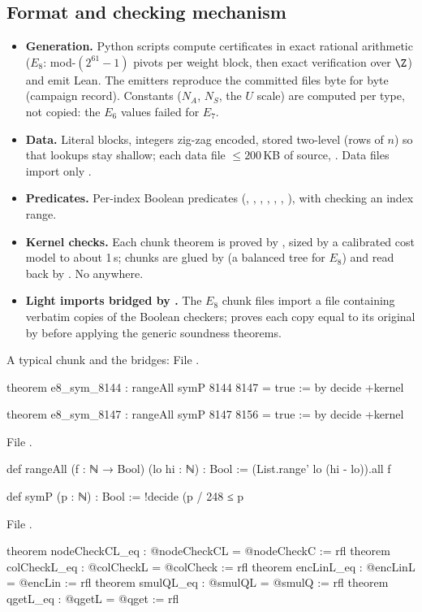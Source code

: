 \subsection{Format and checking mechanism}

\begin{itemize}
\item \textbf{Generation.} Python scripts compute certificates in
  exact rational arithmetic ($E_8$: mod-$(2^{61}-1)$ pivots per weight block, then exact verification over $\Z$) and
  emit Lean. The emitters reproduce the committed files byte for byte (campaign record). Constants
  ($N_A$, $N_S$, the $U$ scale) are computed per type, not copied: the $E_6$ values failed for $E_7$.
\item \textbf{Data.} Literal  blocks, integers zig-zag encoded, stored two-level (rows of $n$) so
  that  lookups stay shallow; each data file $\le200$\,KB of source, .
  Data files import only .
\item \textbf{Predicates.} Per-index Boolean predicates (, , , ,
  , , ), with  checking an index range.
\item \textbf{Kernel checks.} Each chunk theorem is  proved by , sized
  by a calibrated cost model to about 1\,s; chunks are glued by  (a balanced tree for $E_8$) and
  read back by . No  anywhere.
\item \textbf{Light imports bridged by .} The $E_8$ chunk files import a file 
  containing verbatim copies of the Boolean checkers;  proves each copy equal to its original
  by  before applying the generic soundness theorems.
\end{itemize}
A typical chunk and the bridges:
\noindent File .
\begin{leancode}
theorem e8_sym_8144 : rangeAll symP 8144 8147 = true := by decide +kernel

theorem e8_sym_8147 : rangeAll symP 8147 8156 = true := by decide +kernel
\end{leancode}
\noindent File .
\begin{leancode}
def rangeAll (f : ℕ → Bool) (lo hi : ℕ) : Bool := (List.range' lo (hi - lo)).all f

def symP (p : ℕ) : Bool := !decide (p / 248 ≤ p %
\end{leancode}
\noindent File .
\begin{leancode}
theorem nodeCheckCL_eq : @nodeCheckCL = @nodeCheckC := rfl
theorem colCheckL_eq : @colCheckL = @colCheck := rfl
theorem encLinL_eq : @encLinL = @encLin := rfl
theorem smulQL_eq : @smulQL = @smulQ := rfl
theorem qgetL_eq : @qgetL = @qget := rfl
\end{leancode}

